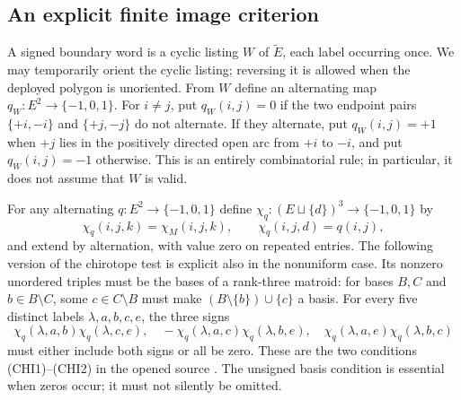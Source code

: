 \subsection{An explicit finite image criterion}

A signed boundary word is a cyclic listing $W$ of $\widetilde E$, each
label occurring once.  We may temporarily orient the cyclic listing;
reversing it is allowed when the deployed polygon is unoriented.  From
$W$ define an alternating map $q_W:E^2\longrightarrow\{-1,0,1\}$.
For $i\ne j$, put $q_W(i,j)=0$ if the two endpoint pairs
$\{+i,-i\}$ and $\{+j,-j\}$ do not alternate.  If they alternate, put
$q_W(i,j)=+1$ when $+j$ lies in the positively directed open arc from
$+i$ to $-i$, and put $q_W(i,j)=-1$ otherwise.  This is an entirely
combinatorial rule; in particular, it does not assume that $W$ is valid.

For any alternating $q:E^2\longrightarrow\{-1,0,1\}$ define
$\chi_q:(E\sqcup\{d\})^3\longrightarrow\{-1,0,1\}$ by
\begin{equation}
 \chi_q(i,j,k)=\chi_M(i,j,k),\qquad
 \chi_q(i,j,d)=q(i,j),                                      \label{eq:P-combined}
\end{equation}
and extend by alternation, with value zero on repeated entries.  The
following version of the chirotope test is explicit also in the
nonuniform case.  Its nonzero unordered triples must be the bases of a
rank-three matroid: for bases $B,C$ and $b\in B\setminus C$, some
$c\in C\setminus B$ must make $(B\setminus\{b\})\cup\{c\}$ a basis.
For every five distinct labels $\lambda,a,b,c,e$, the three signs
\begin{equation}
 \chi_q(\lambda,a,b)\chi_q(\lambda,c,e),\quad
 -\chi_q(\lambda,a,c)\chi_q(\lambda,b,e),\quad
 \chi_q(\lambda,a,e)\chi_q(\lambda,b,c)                    \label{eq:P-GP}
\end{equation}
must either include both signs or all be zero.  These are the two
conditions (CHI1)--(CHI2) in the opened source
\cite[\S7.2.3, p.~10]{RGZpreprint}.  The unsigned basis condition is
essential when zeros occur; it must not silently be omitted.

